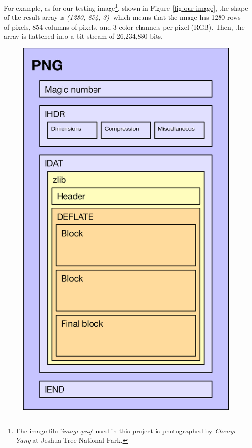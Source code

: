 \documentclass{article}
\begin{document}
For example, as for our testing image\footnote{The image file '\textit{image.png}' used in this project is photographed by \textit{Chenye Yang} at Joshua Tree National Park.}, shown in Figure~\ref{fig:our-image}, the shape of the result array is \textit{(1280, 854, 3)}, which means that the image has 1280 rows of pixels, 854 columns of pixels, and 3 color channels per pixel (RGB). 
Then, the array is flattened into a bit stream of 26,234,880 bits.


\begin{figure}[htb]
    \centering
    \hfill
    \begin{minipage}[b]{0.3\textwidth}
        \includegraphics[width=\textwidth]{png-file-format.png}

\end{minipage}
\end{figure}
\end{document}
